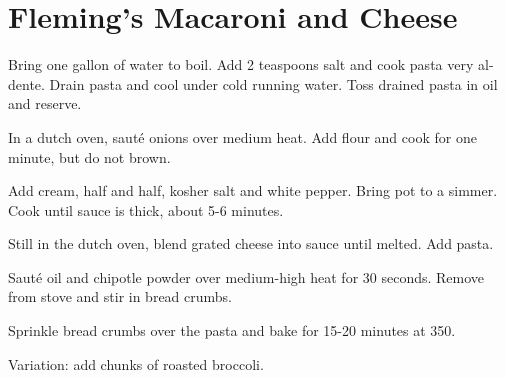 
\section{Fleming's Macaroni and Cheese}
\begin{recipe}



Bring one gallon of water to boil. Add 2 teaspoons salt and cook pasta very al-dente. Drain pasta and cool under cold running water. Toss drained pasta in oil and reserve.

\columnbreak


In a dutch oven, sauté onions over medium heat. Add flour and cook for one minute, but do not brown.


Add cream, half and half, kosher salt and white pepper. Bring pot to a simmer. Cook until sauce is thick, about 5-6 minutes.


Still in the dutch oven, blend grated cheese into sauce until melted. Add pasta.


Sauté oil and chipotle powder over medium-high heat for 30 seconds. Remove from stove and stir in bread crumbs.

Sprinkle bread crumbs over the pasta and bake for 15-20 minutes at 350\degree.

Variation: add chunks of roasted broccoli.

\end{recipe}
